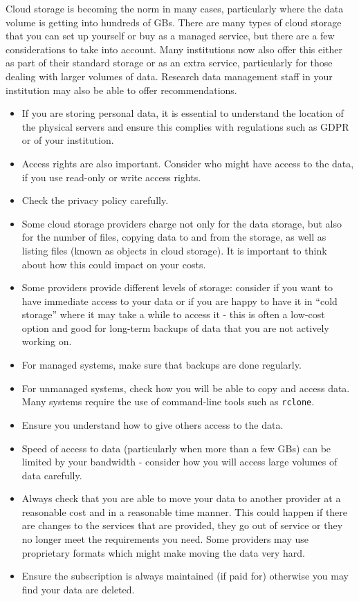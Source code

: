 \documentclass[12pt,a4paper,oneside]{report}
\providecommand{\tightlist}{%
  \setlength{\itemsep}{0pt}\setlength{\parskip}{0pt}}
\begin{document}
Cloud storage is becoming the norm in many cases, particularly where the
data volume is getting into hundreds of GBs. There are many types of
cloud storage that you can set up yourself or buy as a managed service,
but there are a few considerations to take into account. Many
institutions now also offer this either as part of their standard
storage or as an extra service, particularly for those dealing with
larger volumes of data. Research data management staff in your
institution may also be able to offer recommendations.

\begin{itemize}
\tightlist
\item
  If you are storing personal data, it is essential to understand the
  location of the physical servers and ensure this complies with
  regulations such as GDPR or of your institution.
\item
  Access rights are also important. Consider who might have access to
  the data, if you use read-only or write access rights.
\item
  Check the privacy policy carefully.
\item
  Some cloud storage providers charge not only for the data storage, but
  also for the number of files, copying data to and from the storage, as
  well as listing files (known as objects in cloud storage). It is
  important to think about how this could impact on your costs.
\item
  Some providers provide different levels of storage: consider if you
  want to have immediate access to your data or if you are happy to have
  it in ``cold storage'' where it may take a while to access it - this
  is often a low-cost option and good for long-term backups of data that
  you are not actively working on.
\item
  For managed systems, make sure that backups are done regularly.
\item
  For unmanaged systems, check how you will be able to copy and access
  data. Many systems require the use of command-line tools such as
  \texttt{rclone}.
\item
  Ensure you understand how to give others access to the data.
\item
  Speed of access to data (particularly when more than a few GBs) can be
  limited by your bandwidth - consider how you will access large volumes
  of data carefully.
\item
  Always check that you are able to move your data to another provider
  at a reasonable cost and in a reasonable time manner. This could
  happen if there are changes to the services that are provided, they go
  out of service or they no longer meet the requirements you need. Some
  providers may use proprietary formats which might make moving the data
  very hard.
\item
  Ensure the subscription is always maintained (if paid for) otherwise
  you may find your data are deleted.
\end{itemize}
\end{document}
